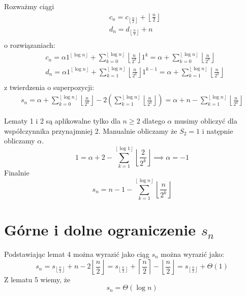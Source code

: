 \documentclass[12pt]{article}
\newcommand{\floor}[1]{\left\lfloor #1  \right\rfloor}
\newcommand{\ceil}[1]{\left\lceil #1 \right\rceil}
\begin{document}
Rozważmy ciągi 
\begin{align*}
&c_n = c_{\floor{\frac{n}{2}}}+\floor{\frac{n}{2}} \\
&d_n = d_{\floor{\frac{n}{2}}}+n \\
\end{align*}
o rozwiązaniach: 
\begin{align*}
    &c_n = \alpha 1^{\floor{\log n}} +  \sum^{\floor{\log n}}_{k=0} \floor{\frac{n}{2^k}}1^k= \alpha + \sum^{\floor{\log n}}_{k=0} \floor{\frac{n}{2^k}} \\
    &d_n = \alpha 1^{\floor{\log n}} +  \sum^{\floor{\log n}}_{k=1} \floor{\frac{n}{2^k}}1^{k-1}= \alpha + \sum^{\floor{\log n}}_{k=1} \floor{\frac{n}{2^k}} \\
\end{align*}
z twierdzenia o superpozycji: 
\begin{align*}
    s_n = \alpha + \sum^{\floor{\log n}}_{k=0} \floor{\frac{n}{2^k}} - 2 \left(\sum^{\floor{\log n}}_{k=1} \floor{\frac{n}{2^k}} \right) = \alpha +n - \sum^{\floor{\log n}}_{k=1} \floor{\frac{n}{2^k}}
\end{align*}

Lematy 1 i 2 są aplikowalne tylko dla $n\ge 2$ dlatego $\alpha$ musimy obliczyć dla współczynnika przynajmniej 2.
Manualnie obliczamy że $S_2 = 1$ i natępnie obliczamy $\alpha$.
$$
1=\alpha +2 - \sum^{\floor{\log 1}}_{k=1} \floor{\frac{2}{2^k}} \implies \alpha=-1
$$
Finalnie 
$$
s_n =  n - 1 - \sum^{\floor{\log n}}_{k=1} \floor{\frac{n}{2^k}}
$$
\section*{Górne i dolne ograniczenie $s_n$}
Podstawiając lemat 4 można wyrazić jako ciąg $s_n$ można wyrazić jako:
$$
s_n = s_{\floor{\frac{n}{2}}} + n - 2\floor{\frac{n}{2}} = s_{\floor{\frac{n}{2}}} + \ceil{\frac{n}{2}} -\floor{\frac{n}{2}} = s_{\floor{\frac{n}{2}}} + \Theta(1)
$$
Z lematu 5 wiemy, że 
$$ s_n = \Theta(\log n)$$
\end{document}
